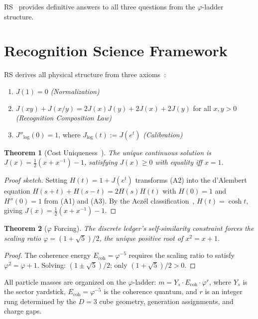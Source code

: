 \documentclass[12pt,a4paper]{article}
\newtheorem{theorem}{Theorem}[section]
\theoremstyle{definition}
\theoremstyle{remark}
\begin{document}
RS~\cite{RS_Axioms} provides definitive answers to all three
questions from the $\varphi$-ladder structure.

\section{Recognition Science Framework}
\label{sec:framework}

RS derives all physical structure from three axioms~\cite{RS_Axioms}:
\begin{enumerate}[label=(A\arabic*),nosep]
  \item $J(1) = 0$ \hfill\textit{(Normalization)}
  \item $J(xy) + J(x/y) = 2J(x)J(y) + 2J(x) + 2J(y)$ for all $x, y > 0$
  \hfill\textit{(Recognition Composition Law)}
  \item $J''_{\log}(0) = 1$, where $J_{\log}(t) := J(e^t)$
  \hfill\textit{(Calibration)}
\end{enumerate}

\begin{theorem}[Cost Uniqueness~\cite{RS_Axioms}]
\label{thm:J}
The unique continuous solution is $J(x) = \tfrac{1}{2}(x + x^{-1}) - 1$,
satisfying $J(x) \geq 0$ with equality iff $x = 1$.
\end{theorem}

\begin{proof}[Proof sketch]
Setting $H(t) = 1 + J(e^t)$ transforms (A2) into the d'Alembert equation
$H(s+t)+H(s-t) = 2H(s)H(t)$ with $H(0)=1$ and $H''(0)=1$ from (A1)
and (A3).  By the Acz\'el classification~\cite{Aczel1966},
$H(t) = \cosh t$, giving $J(x) = \tfrac{1}{2}(x+x^{-1})-1$.
\end{proof}

\begin{theorem}[$\varphi$ Forcing]
\label{thm:phi}
The discrete ledger's self-similarity constraint forces the scaling
ratio $\varphi = (1+\sqrt{5})/2$, the unique positive root of
$x^2 = x + 1$.
\end{theorem}

\begin{proof}
The coherence energy $E_{\mathrm{coh}} = \varphi^{-5}$ requires the
scaling ratio to satisfy $\varphi^2 = \varphi + 1$.  Solving:
$(1 \pm \sqrt{5})/2$; only $(1+\sqrt{5})/2 > 0$.
\end{proof}

All particle masses are organized on the $\varphi$-ladder:
$m = Y_s \cdot E_{\mathrm{coh}} \cdot \varphi^r$, where
$Y_s$ is the sector yardstick, $E_{\mathrm{coh}} = \varphi^{-5}$
is the coherence quantum, and $r$ is an integer rung determined
by the $D = 3$ cube geometry, generation assignments, and charge
gaps.
\end{document}
